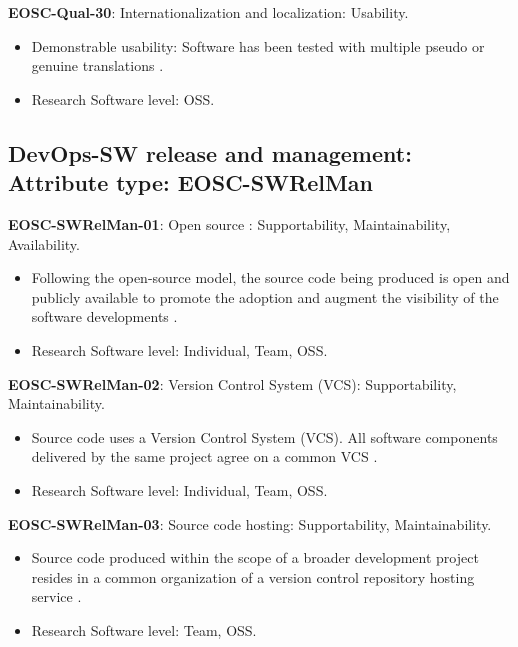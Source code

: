 \textbf{EOSC-Qual-30}: Internationalization and localization: Usability.

\begin{itemize}
    \item Demonstrable usability: Software has been tested with multiple pseudo or genuine translations \cite{shepherdson_cessda_2019}.
    \item Research Software level: OSS.
\end{itemize}

\subsection{DevOps-SW release and management: Attribute type: EOSC-SWRelMan}

\textbf{EOSC-SWRelMan-01}: Open source : Supportability, Maintainability, Availability.

\begin{itemize}
    \item Following the open-source model, the source code being produced is open and publicly available to promote the adoption and augment the visibility of the software developments \cite{orviz_set_2017,raymond_software_2013}.
    \item Research Software level: Individual, Team, OSS.
\end{itemize}

\textbf{EOSC-SWRelMan-02}: Version Control System (VCS): Supportability, Maintainability.

\begin{itemize}
    \item Source code uses a Version Control System (VCS). All software components delivered by the same project agree on a common VCS \cite{orviz_set_2017}.
    \item Research Software level: Individual, Team, OSS.
\end{itemize}

\textbf{EOSC-SWRelMan-03}: Source code hosting: Supportability, Maintainability.

\begin{itemize}
    \item Source code produced within the scope of a broader development project resides in a common organization of a version control repository hosting service \cite{orviz_set_2017}.
    \item Research Software level: Team, OSS.
\end{itemize}

